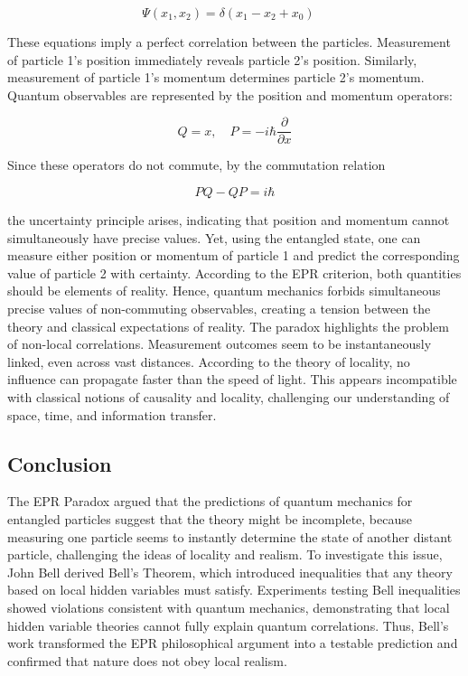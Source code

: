 \documentclass[14pt,a4paper]{extarticle}
\begin{document}
\begin{equation}
\Psi(x_1, x_2) = \delta(x_1 - x_2 + x_0) \quad
\end{equation}

These equations imply a perfect correlation between the particles. Measurement of particle 1’s position immediately reveals particle 2’s position. Similarly, measurement of particle 1’s momentum determines particle 2’s momentum. Quantum observables are represented by the position and momentum operators:

\[
Q = x, \quad P = -i\hbar \frac{\partial}{\partial x}
\]

Since these operators do not commute, by the commutation relation

\[
PQ - QP = i\hbar
\]

the uncertainty principle arises, indicating that position and momentum cannot simultaneously have precise values. Yet, using the entangled state, one can measure either position or momentum of particle 1 and predict the corresponding value of particle 2 with certainty. According to the EPR criterion, both quantities should be elements of reality. Hence, quantum mechanics forbids simultaneous precise values of non-commuting observables, creating a tension between the theory and classical expectations of reality. The paradox highlights the problem of non-local correlations. Measurement outcomes seem to be instantaneously linked, even across vast distances. According to the theory of locality, no influence can propagate faster than the speed of light. This appears incompatible with classical notions of causality and locality, challenging our understanding of space, time, and information transfer.

\subsection{Conclusion}

The EPR Paradox argued that the predictions of quantum mechanics for entangled particles suggest that the theory might be incomplete, because measuring one particle seems to instantly determine the state of another distant particle, challenging the ideas of locality and realism. To investigate this issue, John Bell derived Bell's Theorem, which introduced inequalities that any theory based on local hidden variables must satisfy. Experiments testing Bell inequalities showed violations consistent with quantum mechanics, demonstrating that local hidden variable theories cannot fully explain quantum correlations. Thus, Bell’s work transformed the EPR philosophical argument into a testable prediction and confirmed that nature does not obey local realism.
\end{document}
